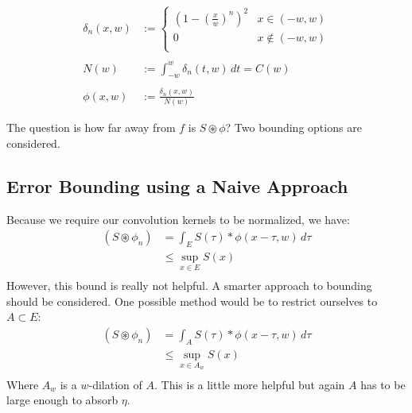 \documentclass[11pt]{amsart}
\theoremstyle{definition}
\theoremstyle{remark}
\begin{document}
\begin{align*}
	\delta_n(x, w)&:=
	\begin{cases}
	\left(1-\left(\frac{x}{w}\right)^n\right)^2 & x\in (-w, w)\\
	0&x\not\in (-w, w)\\
	\end{cases}\\\\
	N(w)&:=\int_{-w}^w\delta_n(t, w)\,dt = C(w)\\\\
	\phi(x,w)&:= \frac{\delta_n(x,w)}{N(w)}
\end{align*}

The question is how far away from $f$ is $S \circledast \phi$? Two bounding options are considered.

\subsection{Error Bounding using a Naive Approach}
Because we require our convolution kernels to be normalized, we have:
\begin{align*}
	(S\circledast \phi_n) &= \int_E S(\tau)*\phi(x-\tau, w)\,d\tau\\
	 &\le \sup_{x\in E} S(x)\quad\\
\end{align*}
However, this bound is really not helpful. A smarter approach to bounding should be considered. One possible method would be to restrict ourselves to $A \subset E$:
\begin{align*}
(S\circledast \phi_n) &= \int_A S(\tau)*\phi(x-\tau, w)\,d\tau\\
&\le \sup_{x\in A_w} S(x)\quad\\
\end{align*}
Where $A_w$ is a $w$-dilation of $A$. This is a little more helpful but again $A$ has to be large enough to absorb $\eta$.
\end{document}
